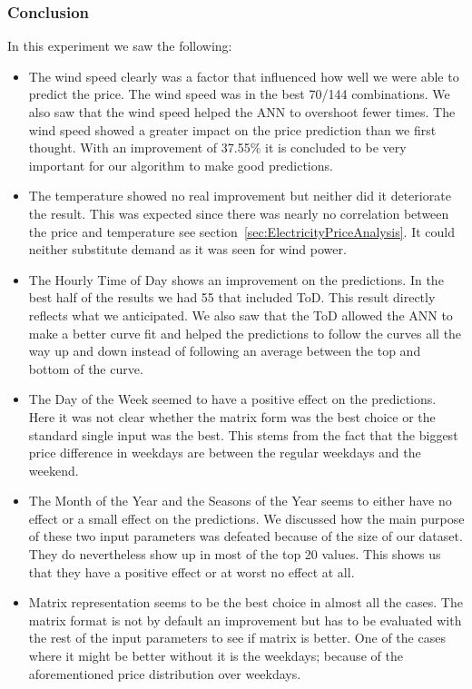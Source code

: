 \subsubsection{Conclusion}
In this experiment we saw the following:
\begin{itemize}
	\item The wind speed clearly was a factor that influenced how well we were able to predict the price. The wind speed was in the best 70/144 combinations. We also saw that the wind speed helped the ANN to overshoot fewer times. The wind speed showed a greater impact on the price prediction than we first thought. With an improvement of 37.55\% it is concluded to be very important for our algorithm to make good predictions.
	\item The temperature showed no real improvement but neither did it deteriorate the result. This was expected since there was nearly no correlation between the price and temperature see section~\ref{sec:ElectricityPriceAnalysis}. It could neither substitute demand as it was seen for wind power.
	\item The Hourly Time of Day shows an improvement on the predictions. In the best half of the results we had 55 that included ToD. This result directly reflects what we anticipated. We also saw that the ToD allowed the ANN to make a better curve fit and helped the predictions to follow the curves all the way up and down instead of following an average between the top and bottom of the curve.
	\item The Day of the Week seemed to have a positive effect on the predictions. Here it was not clear whether the matrix form was the best choice or the standard single input was the best. This stems from the fact that the biggest price difference in weekdays are between the regular weekdays and the weekend.
	\item The Month of the Year and the Seasons of the Year seems to either have no effect or a small effect on the predictions. We discussed how the main purpose of these two input parameters was defeated because of the size of our dataset. They do nevertheless show up in most of the top 20 values. This shows us that they have a positive effect or at worst no effect at all.
	\item Matrix representation seems to be the best choice in almost all the cases. The matrix format is not by default an improvement but has to be evaluated with the rest of the input parameters to see if matrix is better. One of the cases where it might be better without it is the weekdays; because of the aforementioned price distribution over weekdays.
\end{itemize}

